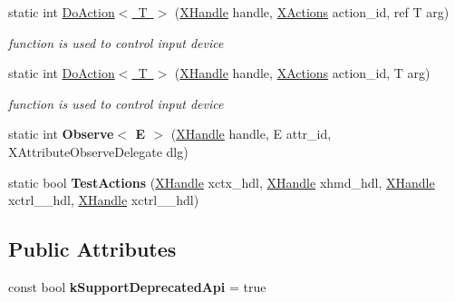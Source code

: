 \begin{DoxyCompactItemize}
static int \mbox{\hyperlink{class_ximmerse_1_1_input_system_1_1_x_device_plugin_a2989fa4bd61cffedb6a38caca9249652}{Do\+Action$<$ T $>$}} (\mbox{\hyperlink{class_ximmerse_1_1_input_system_1_1_x_device_plugin_1_1_x_handle}{X\+Handle}} handle, \mbox{\hyperlink{class_ximmerse_1_1_input_system_1_1_x_device_plugin_ab7f817a86e5b3af956089fb089b7d0c3}{X\+Actions}} action\+\_\+id, ref T arg)
\begin{DoxyCompactList}\small\item\em function is used to control input device \end{DoxyCompactList}\item 
static int \mbox{\hyperlink{class_ximmerse_1_1_input_system_1_1_x_device_plugin_a71155bd0478631baa8874309296524a5}{Do\+Action$<$ T $>$}} (\mbox{\hyperlink{class_ximmerse_1_1_input_system_1_1_x_device_plugin_1_1_x_handle}{X\+Handle}} handle, \mbox{\hyperlink{class_ximmerse_1_1_input_system_1_1_x_device_plugin_ab7f817a86e5b3af956089fb089b7d0c3}{X\+Actions}} action\+\_\+id, T arg)
\begin{DoxyCompactList}\small\item\em function is used to control input device \end{DoxyCompactList}\item 
\mbox{\label{class_ximmerse_1_1_input_system_1_1_x_device_plugin_a1188534e663a3b619d2f9f932504cf4e}} 
static int {\bfseries Observe$<$ E $>$} (\mbox{\hyperlink{class_ximmerse_1_1_input_system_1_1_x_device_plugin_1_1_x_handle}{X\+Handle}} handle, E attr\+\_\+id, X\+Attribute\+Observe\+Delegate dlg)
\item 
\mbox{\label{class_ximmerse_1_1_input_system_1_1_x_device_plugin_aa12c08d4800a4def681a17f54db7aade}} 
static bool {\bfseries Test\+Actions} (\mbox{\hyperlink{class_ximmerse_1_1_input_system_1_1_x_device_plugin_1_1_x_handle}{X\+Handle}} xctx\+\_\+hdl, \mbox{\hyperlink{class_ximmerse_1_1_input_system_1_1_x_device_plugin_1_1_x_handle}{X\+Handle}} xhmd\+\_\+hdl, \mbox{\hyperlink{class_ximmerse_1_1_input_system_1_1_x_device_plugin_1_1_x_handle}{X\+Handle}} xctrl\+\_\+\_\+hdl, \mbox{\hyperlink{class_ximmerse_1_1_input_system_1_1_x_device_plugin_1_1_x_handle}{X\+Handle}} xctrl\+\_\+\_\+hdl)
\end{DoxyCompactItemize}
\subsection*{Public Attributes}
\begin{DoxyCompactItemize}
\item 
\mbox{\label{class_ximmerse_1_1_input_system_1_1_x_device_plugin_a58a474d463368608ef321694d352dc8c}} 
const bool {\bfseries k\+Support\+Deprecated\+Api} = true
\end{DoxyCompactItemize}


